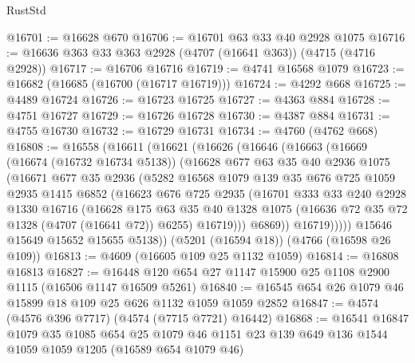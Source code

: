 \begin{lexlean}{RustStd}
\begin{coremodule}
{\begin{coremodule}
{{{{{{{{{{{{{{{{{{{{{{{{{{{{{{{{{{{@16701 := @16628 @670
@16706 := @16701 @63 @33 @40 @2928 @1075
@16716 := @16636 @363 @33 @363 @2928 (@4707 (@16641 @363)) (@4715 (@4716 @2928))
@16717 := @16706 @16716
@16719 := @4741 @16568 @1079
@16723 := @16682 (@16685 (@16700 (@16717 @16719)))
@16724 := @4292 @668
@16725 := @4489 @16724
@16726 := @16723 @16725
@16727 := @4363 @884
@16728 := @4751 @16727
@16729 := @16726 @16728
@16730 := @4387 @884
@16731 := @4755 @16730
@16732 := @16729 @16731
@16734 := @4760 (@4762 @668)
@16808 := @16558
    (@16611
      (@16621
        (@16626
          (@16646
            (@16663
              (@16669
                (@16674 (@16732 @16734 @5138))
                (@16628
                  @677
                  @63
                  @35
                  @40
                  @2936
                  @1075
                  (@16671
                    @677
                    @35
                    @2936
                    (@5282
                      @16568
                      @1079
                      @139
                      @35
                      @676
                      @725
                      @1059
                      @2935
                      @1415
                      @6852
                      (@16623
                        @676
                        @725
                        @2935
                        (@16701
                          @333
                          @33
                          @240
                          @2928
                          @1330
                          @16716
                          (@16628
                            @175
                            @63
                            @35
                            @40
                            @1328
                            @1075
                            (@16636 @72 @35 @72 @1328 (@4707 (@16641 @72)) @6255)
                            @16719)))
                      @6869))
                  @16719)))))
        @15646
        @15649
        @15652
        @15655
        @5138))
    (@5201 (@16594 @18))
    (@4766 (@16598 @26 @109))
@16813 := @4609 (@16605 @109 @25 @1132 @1059)
@16814 := @16808 @16813
@16827 := @16448 @120 @654 @27 @1147 @15900 @25 @1108 @2900 @1115 (@16506 @1147 @16509 @5261)
@16840 := @16545 @654 @26 @1079 @46 @15899 @18 @109 @25 @626 @1132 @1059 @1059 @2852
@16847 := @4574 (@4576 @396 @7717) (@4574 (@7715 @7721) @16442)
@16868 := @16541
    @16847
    @1079
    @35
    @1085
    @654
    @25
    @1079
    @46
    @1151
    @23
    @139
    @649
    @136
    @1544
    @1059
    @1059
    @1205
    (@16589 @654 @1079 @46)
}}}}}}}}}}}}}}}}}}}}}}}}}}}}}}}}}}}
\end{coremodule}}
\end{coremodule}
\end{lexlean}
